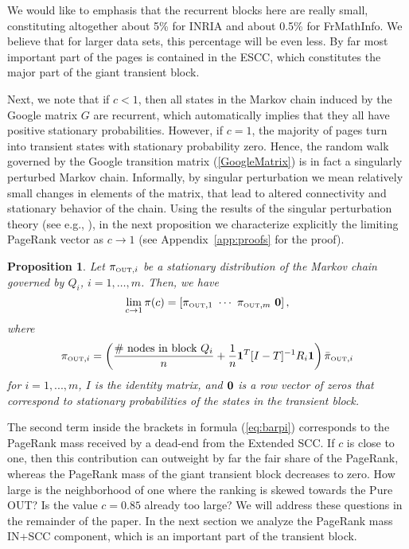 \documentclass{article}
\newtheorem{proposition}{Proposition}
\newcommand{\one}{{\bf 1}}
\newcommand{\zero}{{\bf 0}}
\newcommand{\out}{{\mbox{\tiny OUT}}}
\begin{document}
We would like to emphasis that the recurrent blocks here are really
small, constituting altogether about 5\% for INRIA and about 0.5\%
for FrMathInfo. We believe that for larger data sets, this
percentage will be even less. By far most important part of the
pages is contained in the ESCC, which constitutes the major part of
the giant transient block.

Next, we note that if $c<1$, then all states in the Markov chain
induced by the Google matrix $G$ are recurrent, which automatically
implies that they all have positive stationary probabilities.
However, if $c=1$, the majority of pages turn into transient states
with stationary probability zero. Hence, the random walk governed by
the Google transition matrix (\ref{GoogleMatrix}) is in fact a
singularly perturbed Markov chain. Informally, by singular
perturbation we mean relatively small changes in elements of the
matrix, that lead to altered connectivity and stationary behavior of
the chain. Using the results of the singular perturbation theory
(see e.g.,
\cite{Avrachenkov99thesis,KorolyukTurbin,PervozvanskiiGaitsgori,YinZhang}),
in the next proposition we characterize explicitly the limiting
PageRank vector as $c\to 1$ (see Appendix~\ref{app:proofs} for the
proof).

\begin{proposition}
\label{prop:pure_out}
Let ${\pi}_{\out,i}$ be a stationary distribution of the Markov
chain governed by $Q_i$, $i=1,\ldots,m$.
Then, we have
\[
\lim_{c \to 1} \pi(c)= \left[{\pi}_{\out,1} \ \cdots \ {\pi}_{\out,m} \
\zero \right],
\]
where
\begin{equation}
\label{eq:barpi} {\pi}_{\out,i}=
\left(\frac{\mbox{\# nodes in block $Q_i$}}{n}+\frac{1}{n}\one^T[I-{T}]^{-1}{R}_i\one\right)\bar{\pi}_{\out,i}
\end{equation}
for $i=1,...,m$, $I$ is the identity matrix, and $\zero$ is a row
vector of zeros that correspond to stationary probabilities of the
states in the transient block.
\end{proposition}


The second term inside the brackets in formula (\ref{eq:barpi})
corresponds to the Page\-Rank mass received by a dead-end
 from the Extended SCC. If $c$ is close to one, then this
contribution can outweight by far the fair share of the PageRank,
whereas the PageRank mass of the giant transient block decreases to
zero. How large is the neighborhood of one where the ranking is
skewed towards the Pure OUT? Is the value $c=0.85$ already too
large? We will address these questions in the remainder of the
paper. In the next section we analyze the PageRank mass IN+SCC
component, which is an important part of the transient block.
\end{document}
